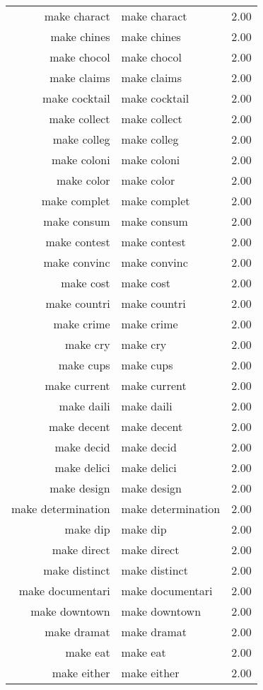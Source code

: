 \begin{table}[ht]
\begin{tabular}{rlr}
  make charact & make charact & 2.00 \\ 
  make chines & make chines & 2.00 \\ 
  make chocol & make chocol & 2.00 \\ 
  make claims & make claims & 2.00 \\ 
  make cocktail & make cocktail & 2.00 \\ 
  make collect & make collect & 2.00 \\ 
  make colleg & make colleg & 2.00 \\ 
  make coloni & make coloni & 2.00 \\ 
  make color & make color & 2.00 \\ 
  make complet & make complet & 2.00 \\ 
  make consum & make consum & 2.00 \\ 
  make contest & make contest & 2.00 \\ 
  make convinc & make convinc & 2.00 \\ 
  make cost & make cost & 2.00 \\ 
  make countri & make countri & 2.00 \\ 
  make crime & make crime & 2.00 \\ 
  make cry & make cry & 2.00 \\ 
  make cups & make cups & 2.00 \\ 
  make current & make current & 2.00 \\ 
  make daili & make daili & 2.00 \\ 
  make decent & make decent & 2.00 \\ 
  make decid & make decid & 2.00 \\ 
  make delici & make delici & 2.00 \\ 
  make design & make design & 2.00 \\ 
  make determination & make determination & 2.00 \\ 
  make dip & make dip & 2.00 \\ 
  make direct & make direct & 2.00 \\ 
  make distinct & make distinct & 2.00 \\ 
  make documentari & make documentari & 2.00 \\ 
  make downtown & make downtown & 2.00 \\ 
  make dramat & make dramat & 2.00 \\ 
  make eat & make eat & 2.00 \\ 
  make either & make either & 2.00 \\ 

\end{tabular}
\end{table}
